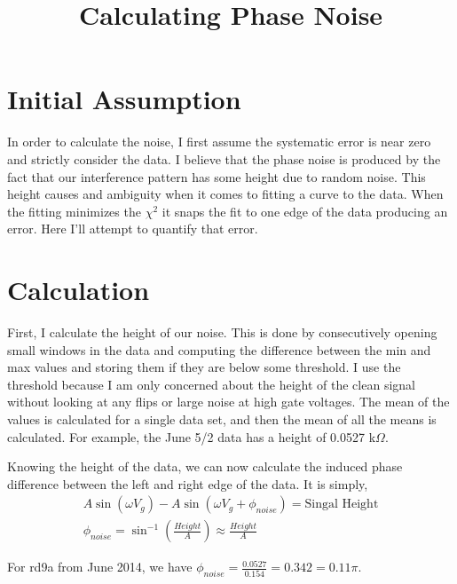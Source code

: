 \documentclass[]{article}
\title{Calculating Phase Noise}
\author{}
\begin{document}
\maketitle



\section*{Initial Assumption}
In order to calculate the noise, I first assume the systematic error is near zero and strictly consider the data. I believe that the phase noise is produced by the fact that our interference pattern has some height due to random noise. This height causes and ambiguity when it comes to fitting a curve to the data. When the fitting minimizes the $\chi^2$ it snaps the fit to one edge of the data producing an error. Here I'll attempt to quantify that error. 
\section*{Calculation}
First, I calculate the height of our noise. This is done by consecutively opening small windows in the data and computing the difference between the min and max values and storing them if they are below some threshold. I use the threshold because I am only concerned about the height of the clean signal without looking at any flips or large noise at high gate voltages. The mean of the values is calculated for a single data set, and then the mean of all the means is calculated. For example, the June 5/2 data has a height of 0.0527 k$\Omega$.

Knowing the height of the data, we can now calculate the induced phase difference between the left and right edge of the data. It is simply,
\begin{eqnarray}
A\sin(\omega V_g) - A\sin(\omega V_g + \phi_{noise}) = \text{Singal Height} \\
\phi_{noise} = \sin^{-1}(\frac{Height}{A}) \approx \frac{Height}{A}
\end{eqnarray}

For rd9a from June 2014, we have $\phi_{noise} = \frac{0.0527}{0.154} = 0.342 = 0.11 \pi$.
\end{document}
